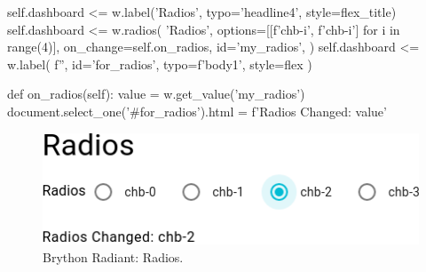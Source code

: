\begin{python}
    self.dashboard <= w.label('Radios', typo='headline4', style=flex_title)
    self.dashboard <= w.radios(
        'Radios',
        options=[[f'chb-{i}', f'chb-{i}'] for i in range(4)],
        on_change=self.on_radios,
        id='my_radios',
    )
    self.dashboard <= w.label(
        f'', id='for_radios', typo=f'body1', style=flex
    )


def on_radios(self):
    value = w.get_value('my_radios')
    document.select_one('#for_radios').html = f'Radios Changed: {value}'
\end{python}


\begin{figure}[H]
\begin{centering}
\includegraphics[scale=0.5]{Cap4/Figures/widgets/radios.png}
\par\end{centering}
\caption[Brython Radiant: Radios]{Brython Radiant: Radios.}
\label{fig:radiant_radios}
\end{figure}